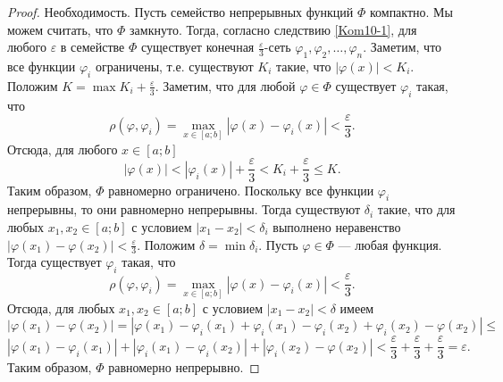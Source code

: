 \documentclass[12pt, titlepage, oneside]{amsbook}
\theoremstyle{definition}
\theoremstyle{remark}
\begin{document}
\begin{proof}
Необходимость. Пусть семейство непрерывных функций $\Phi$ компактно. Мы можем считать, что $\Phi$ замкнуто. Тогда, согласно следствию \ref{Kom10-1}, для любого $\varepsilon$ в семействе $\Phi$ существует конечная $\frac{\varepsilon}{3}$-сеть $\varphi_1,\varphi_2,\ldots,\varphi_n$. Заметим, что все функции $\varphi_i$ ограничены, т.е. существуют $K_i$ такие, что $|\varphi(x)|<K_i$. Положим $K=\max K_i+\frac{\varepsilon}{3}$. Заметим, что для любой $\varphi\in\Phi$ существует $\varphi_i$ такая, что $$\rho(\varphi,\varphi_i)=\max\limits_{x\in[a;b]}|\varphi(x)-\varphi_i(x)|<\frac{\varepsilon}{3}.$$ Отсюда, для любого $x\in[a;b]$ $$|\varphi(x)|<|\varphi_i(x)|+\frac{\varepsilon}{3}<K_i+\frac{\varepsilon}{3}\leq K.$$ Таким образом, $\Phi$ равномерно ограничено. Поскольку все функции $\varphi_i$ непрерывны, то они равномерно непрерывны. Тогда существуют $\delta_i$ такие, что для любых $x_1,x_2\in[a;b]$ с условием $|x_1-x_2|<\delta_i$ выполнено неравенство $|\varphi(x_1)-\varphi(x_2)|<\frac{\varepsilon}{3}$. Положим $\delta=\min\delta_i$. Пусть $\varphi\in\Phi$ --- любая функция. Тогда существует $\varphi_i$ такая, что $$\rho(\varphi,\varphi_i)=\max\limits_{x\in[a;b]}|\varphi(x)-\varphi_i(x)|<\frac{\varepsilon}{3}.$$ Отсюда, для любых $x_1,x_2\in[a;b]$ с условием $|x_1-x_2|<\delta$ имеем $$|\varphi(x_1)-\varphi(x_2)|=|\varphi(x_1)-\varphi_i(x_1)+\varphi_i(x_1)-\varphi_i(x_2)+\varphi_i(x_2)-\varphi(x_2)|\leq$$ $$|\varphi(x_1)-\varphi_i(x_1)|+|\varphi_i(x_1)-\varphi_i(x_2)|+|\varphi_i(x_2)-\varphi(x_2)|<\frac{\varepsilon}{3}+\frac{\varepsilon}{3}+\frac{\varepsilon}{3}=\varepsilon.$$ Таким образом, $\Phi$ равномерно непрерывно.


\end{proof}
\end{document}
